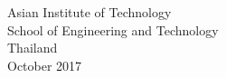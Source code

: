 \begin{center}
  \singlespace Asian Institute of Technology\\ School of Engineering
                  and Technology\\ Thailand\\ October 2017
\end{center}
\vfill

\newpage
\pagestyle{plain}


\newpage
\pagestyle{plain}
\onecolumn %
\if@twoside\else\raggedbottom\fi %

\setlength{\footskip}{8mm}



\setlength{\parskip}{0pt} 
\newpage
{}
\tableofcontents


\newpage
{}
\listoffigures







\setlength{\parskip}{12pt}

